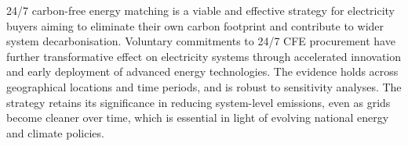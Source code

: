 24/7 carbon-free energy matching is a viable and effective strategy for electricity buyers aiming to eliminate their own carbon footprint and contribute to wider system decarbonisation.
Voluntary commitments to 24/7 CFE procurement have further transformative effect on electricity systems through accelerated innovation and early deployment of advanced energy technologies.
The evidence holds across geographical locations and time periods, and is robust to sensitivity analyses.
The strategy retains its significance in reducing system-level emissions, even as grids become cleaner over time, which is essential in light of evolving national energy and climate policies.